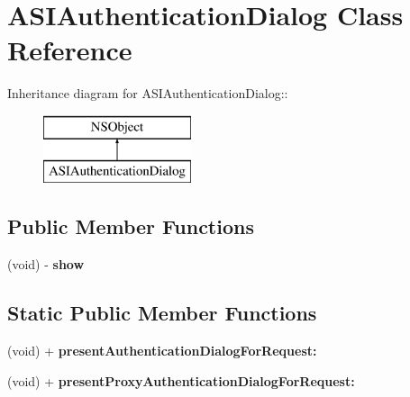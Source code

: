 \hypertarget{interface_a_s_i_authentication_dialog}{
\section{ASIAuthenticationDialog Class Reference}
\label{interface_a_s_i_authentication_dialog}
}
Inheritance diagram for ASIAuthenticationDialog::\begin{figure}[H]
\begin{center}
\leavevmode
\includegraphics[height=2cm]{interface_a_s_i_authentication_dialog}
\end{center}
\end{figure}
\subsection*{Public Member Functions}
\begin{DoxyCompactItemize}
\item 
\hypertarget{interface_a_s_i_authentication_dialog_ac12b99fc65aed45271e0522e491112b5}{
(void) -\/ {\bfseries show}}
\label{interface_a_s_i_authentication_dialog_ac12b99fc65aed45271e0522e491112b5}

\end{DoxyCompactItemize}
\subsection*{Static Public Member Functions}
\begin{DoxyCompactItemize}
\item 
\hypertarget{interface_a_s_i_authentication_dialog_a07eb1b70ffa5f5279a32a23f3e1de378}{
(void) + {\bfseries presentAuthenticationDialogForRequest:}}
\label{interface_a_s_i_authentication_dialog_a07eb1b70ffa5f5279a32a23f3e1de378}

\item 
\hypertarget{interface_a_s_i_authentication_dialog_a9a416683bb30a40ee4b30235c0a95797}{
(void) + {\bfseries presentProxyAuthenticationDialogForRequest:}}
\label{interface_a_s_i_authentication_dialog_a9a416683bb30a40ee4b30235c0a95797}

\end{DoxyCompactItemize}
